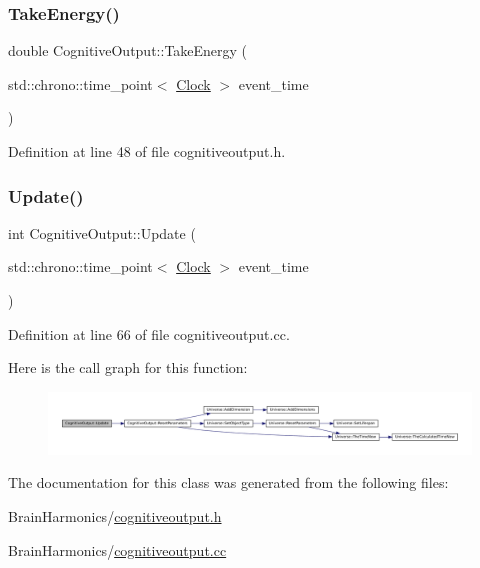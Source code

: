 \subsubsection{\texorpdfstring{Take\+Energy()}{TakeEnergy()}}
{\footnotesize\ttfamily double Cognitive\+Output\+::\+Take\+Energy (\begin{DoxyParamCaption}\item[{std\+::chrono\+::time\+\_\+point$<$ \mbox{\hyperlink{universe_8h_a0ef8d951d1ca5ab3cfaf7ab4c7a6fd80}{Clock}} $>$}]{event\+\_\+time }\end{DoxyParamCaption})\hspace{0.3cm}{\ttfamily [inline]}}



Definition at line 48 of file cognitiveoutput.\+h.

\mbox{\label{class_cognitive_output_a2b4d33c7a529402c684d828efd25095a}} 
\subsubsection{\texorpdfstring{Update()}{Update()}}
{\footnotesize\ttfamily int Cognitive\+Output\+::\+Update (\begin{DoxyParamCaption}\item[{std\+::chrono\+::time\+\_\+point$<$ \mbox{\hyperlink{universe_8h_a0ef8d951d1ca5ab3cfaf7ab4c7a6fd80}{Clock}} $>$}]{event\+\_\+time }\end{DoxyParamCaption})}



Definition at line 66 of file cognitiveoutput.\+cc.

Here is the call graph for this function\+:\nopagebreak
\begin{figure}[H]
\begin{center}
\leavevmode
\includegraphics[width=350pt]{class_cognitive_output_a2b4d33c7a529402c684d828efd25095a_cgraph}
\end{center}
\end{figure}


The documentation for this class was generated from the following files\+:\begin{DoxyCompactItemize}
\item 
Brain\+Harmonics/\mbox{\hyperlink{cognitiveoutput_8h}{cognitiveoutput.\+h}}\item 
Brain\+Harmonics/\mbox{\hyperlink{cognitiveoutput_8cc}{cognitiveoutput.\+cc}}\end{DoxyCompactItemize}
